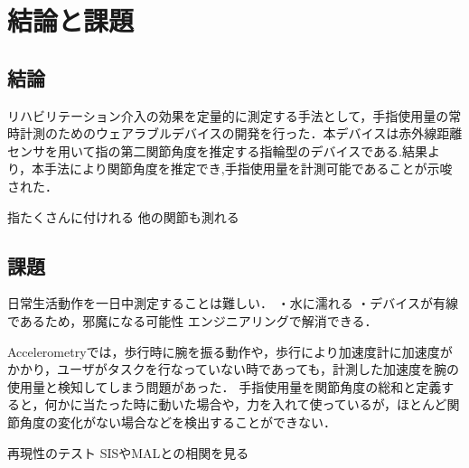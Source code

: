 \chapter{結論と課題}

\section{結論}

リハビリテーション介入の効果を定量的に測定する手法として，手指使用量の常時計測のためのウェアラブルデバイスの開発を行った．本デバイスは赤外線距離センサを用いて指の第二関節角度を推定する指輪型のデバイスである.結果より，本手法により関節角度を推定でき,手指使用量を計測可能であることが示唆された．






指たくさんに付けれる
他の関節も測れる

\section{課題}
日常生活動作を一日中測定することは難しい．
・水に濡れる
・デバイスが有線であるため，邪魔になる可能性
エンジニアリングで解消できる．

Accelerometryでは，歩行時に腕を振る動作や，歩行により加速度計に加速度がかかり，ユーザがタスクを行なっていない時であっても，計測した加速度を腕の使用量と検知してしまう問題があった．
手指使用量を関節角度の総和と定義すると，何かに当たった時に動いた場合や，力を入れて使っているが，ほとんど関節角度の変化がない場合などを検出することができない．


再現性のテスト
SISやMALとの相関を見る